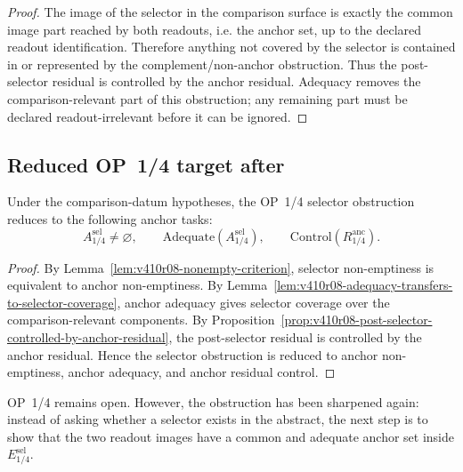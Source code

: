 \begin{proof}
The image of the selector in the comparison surface is exactly the common image
part reached by both readouts, i.e. the anchor set, up to the declared readout
identification. Therefore anything not covered by the selector is contained in
or represented by the complement/non-anchor obstruction. Thus the post-selector
residual is controlled by the anchor residual. Adequacy removes the
comparison-relevant part of this obstruction; any remaining part must be
declared readout-irrelevant before it can be ignored.
\end{proof}

\subsection{Reduced OP~1/4 target after}
\label{subsec:v410r08-reduced-op14-target}

\begin{theorem}
\label{thm:v410r08-op14-selector-obstruction-reduction}
Under the comparison-datum hypotheses, the OP~1/4 selector obstruction reduces
to the following anchor tasks:
\[
 A_{1/4}^{\mathrm{sel}}\neq\varnothing,
 \qquad
 \mathrm{Adequate}(A_{1/4}^{\mathrm{sel}}),
 \qquad
 \mathrm{Control}(R_{1/4}^{\mathrm{anc}}).
\]
\end{theorem}

\begin{proof}
By Lemma~\ref{lem:v410r08-nonempty-criterion}, selector non-emptiness is
equivalent to anchor non-emptiness. By
Lemma~\ref{lem:v410r08-adequacy-transfers-to-selector-coverage}, anchor adequacy
gives selector coverage over the comparison-relevant components. By
Proposition~\ref{prop:v410r08-post-selector-controlled-by-anchor-residual}, the
post-selector residual is controlled by the anchor residual. Hence the
selector obstruction is reduced to anchor non-emptiness, anchor adequacy, and
anchor residual control.
\end{proof}

\begin{remark}
\label{rem:v410r08-op14-status-after-r08}
OP~1/4 remains open. However, the obstruction has been sharpened again:
instead of asking whether a selector exists in the abstract, the next step is to
show that the two readout images have a common and adequate anchor set inside
\(E_{1/4}^{\mathrm{sel}}\).
\end{remark}



